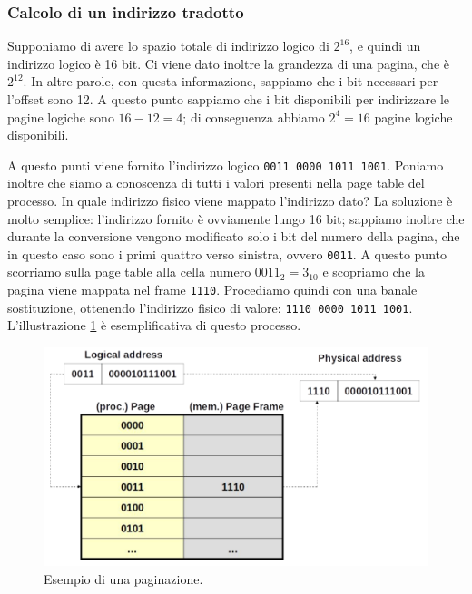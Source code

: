 % 
\subsubsection*{Calcolo di un indirizzo tradotto}
Supponiamo di avere lo spazio totale di indirizzo logico di $2^{16}$, e quindi un indirizzo logico è 16 bit. Ci viene dato inoltre la grandezza di una pagina, che è 
$2^{12}$. In altre parole, con questa informazione, sappiamo che i bit necessari per l'offset sono 12. A questo punto sappiamo che i bit disponibili per indirizzare le pagine logiche sono $16 - 12 = 4$; di conseguenza abbiamo $2^4 = 16$ pagine logiche disponibili.

A questo punti viene fornito l'indirizzo logico \texttt{0011 0000 1011 1001}. Poniamo inoltre che siamo a conoscenza di tutti i valori presenti nella page table del processo. In quale indirizzo fisico viene mappato l'indirizzo dato? La soluzione è molto semplice: l'indirizzo fornito è ovviamente lungo 16 bit; sappiamo inoltre che durante la conversione vengono modificato solo i bit del numero della pagina, che in questo caso sono i primi quattro verso sinistra, ovvero \texttt{0011}. A questo punto scorriamo sulla page table alla cella numero $0011_2  = 3_{10}$ e scopriamo che la pagina viene mappata nel frame \texttt{1110}. Procediamo quindi con una banale sostituzione, ottenendo l'indirizzo fisico di valore: \texttt{1110 0000 1011 1001}. L'illustrazione \ref{fig:paging_example} è esemplificativa di questo processo.
\begin{figure}[h]
    \centering
    \includegraphics[width = .5\textwidth]{../res/imgs/main memory/paging_example.png}
    \caption{Esempio di una paginazione.}
    \label{fig:paging_example}
\end{figure}

% 

